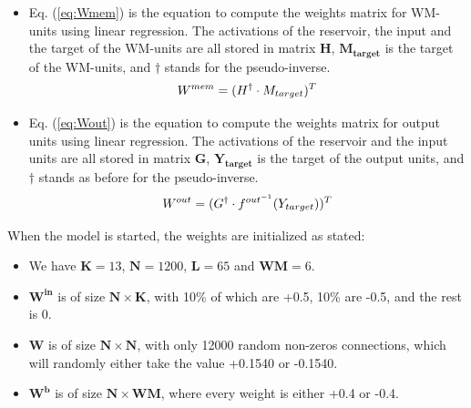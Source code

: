 \begin{itemize}
    \item Eq. (\ref{eq:Wmem}) is the equation to compute the weights matrix for WM-units using linear regression. The activations of the reservoir, the input and the target of the WM-units are all stored in matrix $\mathbf{H}$, $\mathbf{M_{target}}$ is the target of the WM-units, and $\dagger$ stands for the pseudo-inverse.
    \begin{equation} \label{eq:Wmem}
        W^{mem} = (H^{\dagger} \cdot M_{target})^T\\
    \end{equation}
    
    \item Eq. (\ref{eq:Wout}) is the equation to compute the weights matrix for output units using linear regression. The activations of the reservoir and the input units are all stored in matrix $\mathbf{G}$, $\mathbf{Y_{target}}$ is the target of the output units, and $\dagger$ stands as before for the pseudo-inverse.
    \begin{equation} \label{eq:Wout}
        W^{out} = (G^{\dagger} \cdot f^{out^{-1}}(Y_{target}))^T\\
    \end{equation}
    
\end{itemize}

When the model is started, the weights are initialized as stated:
\begin{itemize}
    \item We have $\mathbf{K}=13$, $\mathbf{N}=1200$, $\mathbf{L}=65$ and $\mathbf{WM}=6$.
    \item $\mathbf{W^{in}}$ is of size $\mathbf{N \times K}$, with 10\% of which are +0.5, 10\% are -0.5, and the rest is 0.
    \item $\mathbf{W}$ is of size $\mathbf{N \times N}$, with only 12000 random non-zeros connections, which will randomly either take the value +0.1540 or -0.1540.
    \item $\mathbf{W^{b}}$ is of size $\mathbf{N \times WM}$, where every weight is either +0.4 or -0.4.
    
\end{itemize}

